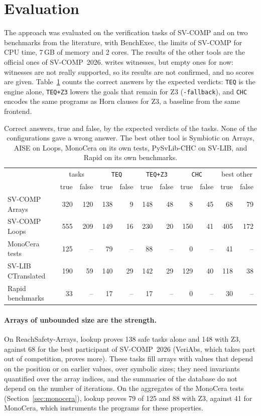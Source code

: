 \section{Evaluation}\label{sec:evaluation}

The approach was evaluated on the verification tasks of SV-COMP and on two benchmarks from the literature, with
BenchExec, the limits of SV-COMP for CPU time, 7\,GB of memory and 2 cores. The results of the other tools are the
official ones of SV-COMP~2026. \cuvee{} writes witnesses, but empty ones for now: witnesses are not really supported,
so its results are not confirmed, and no scores are given. Table~\ref{tab:evaluation} counts the correct answers by
the expected verdicts: \texttt{TEQ} is the engine alone, \texttt{TEQ+Z3} lowers the goals that remain for Z3
(\texttt{-fallback}), and \texttt{CHC} encodes the same programs as Horn clauses for Z3, a baseline from the same
frontend.

\begin{table}[t]
\centering\small
\setlength{\tabcolsep}{4pt}
\begin{tabular}{@{}lrrrrrrrrrr@{}}
\toprule
 & \multicolumn{2}{c}{tasks} & \multicolumn{2}{c}{\texttt{TEQ}} & \multicolumn{2}{c}{\texttt{TEQ+Z3}} &
   \multicolumn{2}{c}{\texttt{CHC}} & \multicolumn{2}{c}{best other} \\
 & true & false & true & false & true & false & true & false & true & false \\
\midrule
SV-COMP Arrays & 320 & 120 & 138 & 9 & 148 & 48 & 8 & 45 & 68 & 79 \\
SV-COMP Loops & 555 & 209 & 149 & 16 & 230 & 20 & 150 & 41 & 405 & 172 \\
MonoCera tests & 125 & -- & 79 & -- & 88 & -- & 0 & -- & 41 & -- \\
SV-LIB CTranslated & 190 & 59 & 140 & 29 & 142 & 29 & 129 & 40 & 118 & 38 \\
Rapid benchmarks & 33 & -- & 17 & -- & 17 & -- & 0 & -- & 30 & -- \\
\bottomrule
\end{tabular}
\caption{Correct answers, true and false, by the expected verdicts of the tasks. None of the configurations gave a
wrong answer. The best other tool is Symbiotic on Arrays, AISE on Loops, MonoCera on its own tests, PySvLib-CHC on
SV-LIB, and Rapid on its own benchmarks.}\label{tab:evaluation}
\end{table}

\paragraph{Arrays of unbounded size are the strength.} On ReachSafety-Arrays, lookup proves 138 safe tasks alone and
148 with Z3, against 68 for the best participant of SV-COMP~2026 (VeriAbs, which takes part out of competition, proves
more). These tasks fill arrays with values that depend on the position or on earlier values, over symbolic sizes; they
need invariants quantified over the array indices, and the summaries of the database do not depend on the number of
iterations. On the aggregates of the MonoCera tests (Section~\ref{sec:monocera}), lookup proves 79 of 125 and 88 with
Z3, against 41 for MonoCera, which instruments the programs for these properties.

